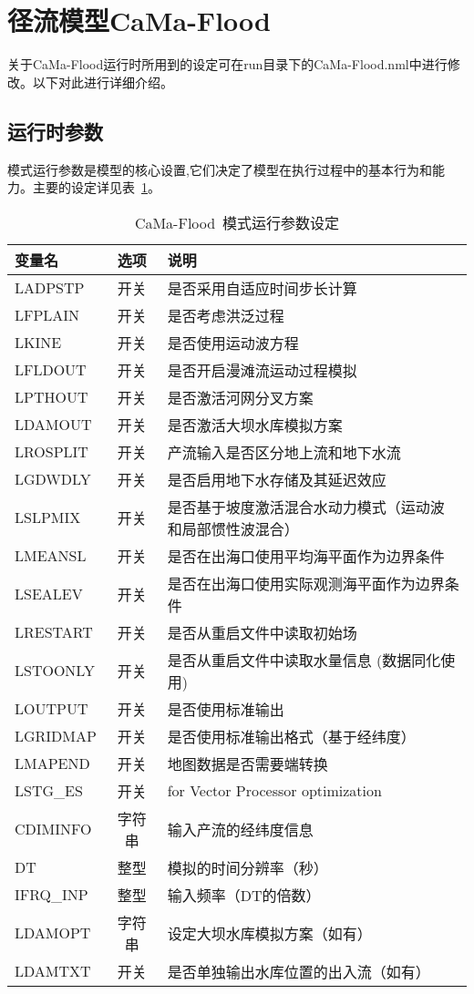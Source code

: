 \section{径流模型CaMa-Flood}
关于CaMa-Flood运行时所用到的设定可在run目录下的CaMa-Flood.nml中进行修改。以下对此进行详细介绍。
\subsection{运行时参数}
模式运行参数是模型的核心设置,它们决定了模型在执行过程中的基本行为和能力。主要的设定详见表~\ref{模式运行参数设定}。

\begin{table}[htbp]
\caption{CaMa-Flood~模式运行参数设定}
\centering \renewcommand{\arraystretch}{1.5}
\label{模式运行参数设定}
\begin{tabular}{lcl}
\toprule
\textbf{变量名} & \textbf{选项} & \textbf{说明} \\\midrule

LADPSTP & 开关 & 是否采用自适应时间步长计算 \\
LFPLAIN & 开关 & 是否考虑洪泛过程 \\
LKINE & 开关 & 是否使用运动波方程 \\
LFLDOUT & 开关 & 是否开启漫滩流运动过程模拟 \\
LPTHOUT & 开关 & 是否激活河网分叉方案 \\
LDAMOUT & 开关 & 是否激活大坝水库模拟方案 \\
LROSPLIT & 开关 & 产流输入是否区分地上流和地下水流 \\
LGDWDLY & 开关 & 是否启用地下水存储及其延迟效应 \\
LSLPMIX & 开关 &
\makecell[l]{是否基于坡度激活混合水动力模式（运动波\\和局部惯性波混合）} \\
LMEANSL & 开关 & 是否在出海口使用平均海平面作为边界条件 \\
LSEALEV & 开关 & 是否在出海口使用实际观测海平面作为边界条件 \\
LRESTART & 开关 & 是否从重启文件中读取初始场 \\
LSTOONLY & 开关 & 是否从重启文件中读取水量信息 (数据同化使用) \\
LOUTPUT & 开关 & 是否使用标准输出 \\
LGRIDMAP & 开关 & 是否使用标准输出格式（基于经纬度） \\
LMAPEND & 开关 & 地图数据是否需要端转换 \\
LSTG\_ES & 开关 & for Vector Processor optimization \\
CDIMINFO & 字符串 & 输入产流的经纬度信息 \\
DT & 整型 & 模拟的时间分辨率（秒） \\
IFRQ\_INP & 整型 & 输入频率（DT的倍数） \\
LDAMOPT & 字符串 & 设定大坝水库模拟方案（如有） \\
LDAMTXT & 开关 & 是否单独输出水库位置的出入流（如有） \\
\bottomrule
\end{tabular}
\end{table}

